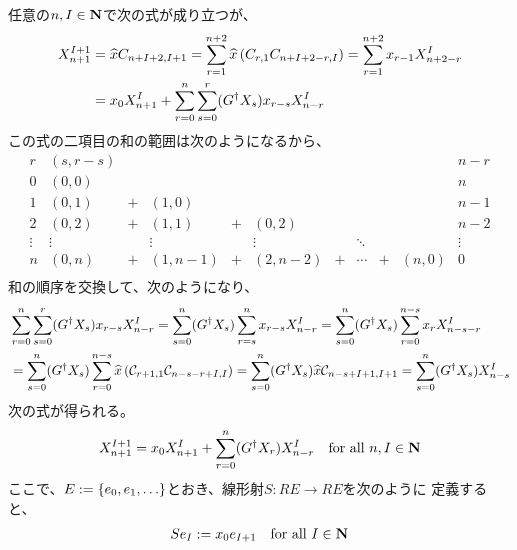 {	任意の$n,I\in\mathbf{N}$で次の式が成り立つが、
	\begin{equation*}\begin{split}
		X_{n+1}^{I+1} &= {\widehat{x}}C_{n+I+2,I+1}
		= \sum_{r=1}^{n+2}{\widehat{x}}\mathinner{({C_{r,1}C_{n+I+2-r,I}})}
		= \sum_{r=1}^{n+2}x_{r-1}X_{n+2-r}^I \\
		&= x_0X_{n+1}^I + \sum_{r=0}^n\sum_{s=0}^r
			(G^\dag X_s)x_{r-s}X_{n-r}^I
	\end{split}\end{equation*}
	この式の二項目の和の範囲は次のようになるから、
	\begin{equation*}\begin{array}{r|ccccccccc|c}
		r & (s,r-s) &&&&&&&&& n-r \\\hline
		0 & (0,0) &&&&&&&&& n \\
		1 & (0,1) &+& (1,0) &&&&&&& n-1 \\
		2 & (0,2) &+& (1,1) &+& (0,2) &&&&& n-2 \\
		\vdots & \vdots && \vdots && \vdots && \ddots &&& \vdots \\
		n & (0,n) &+& (1,n-1) &+& (2,n-2) &+& \cdots &+& (n,0) & 0 \\
	\end{array}\end{equation*}
	和の順序を交換して、次のようになり、
	\begin{equation*}\begin{split}
		&\sum_{r=0}^n\sum_{s=0}^r (G^\dag X_s)x_{r-s}X_{n-r}^I
		= \sum_{s=0}^n (G^\dag X_s) \sum_{r=s}^n x_{r-s}X_{n-r}^I
		= \sum_{s=0}^n (G^\dag X_s) \sum_{r=0}^{n-s} x_rX_{n-s-r}^I \\
		&= \sum_{s=0}^n (G^\dag X_s) \sum_{r=0}^{n-s} 
			{\widehat{x}}\mathinner{({{\mathcal{C}}_{r+1,1}{\mathcal{C}}_{n-s-r+I,I}})}
		= \sum_{s=0}^n (G^\dag X_s){\widehat{x}}{\mathcal{C}}_{n-s+I+1,I+1}
		= \sum_{s=0}^n (G^\dag X_s)X_{n-s}^I
	\end{split}\end{equation*}
	次の式が得られる。
	\begin{equation*}\begin{split}
		X_{n+1}^{I+1} = x_0X_{n+1}^I + \sum_{r=0}^n(G^\dag X_r)X_{n-r}^I
		\quad\text{for all } n,I\in\mathbf{N}
	\end{split}\end{equation*}
	ここで、$E:=\mathinner{\{{e_0,e_1,\dots}\}}$とおき、線形射$S:RE\to RE$を次のように
	定義すると、
	\begin{equation*}\begin{split}
		Se_I := x_0e_{I+1} \quad\text{for all } I\in\mathbf{N}
	\end{split}\end{equation*}
}
